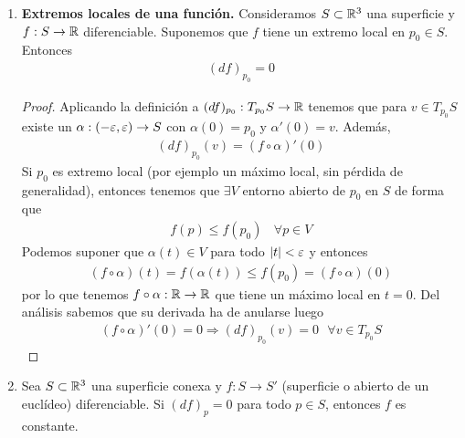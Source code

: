 \begin{propiedades}
\begin{enumerate}
        \item \textbf{Extremos locales de una función.} Consideramos $S\subset \mathbb{R}^3$ una superficie y $f:S\to \mathbb{R}$ diferenciable. Suponemos que $f$ tiene un extremo local en $p_0\in S$. Entonces 
        \begin{gather*}
            (df)_{p_0} = 0
        \end{gather*}
        \begin{proof}
            Aplicando la definición a $(df)_{p_0} : T_{p_0}S \to \mathbb{R}$ tenemos que para $v\in T_{p_0}S$ existe un $\alpha:(-\varepsilon, \varepsilon) \to S$ con $\alpha(0)=p_0$ y $\alpha'(0)=v$. Además,
            \begin{gather*}
                (df)_{p_0}(v) = (f\circ \alpha)'(0)
            \end{gather*}
            Si $p_0$ es extremo local (por ejemplo un máximo local, sin pérdida de generalidad), entonces tenemos que $\exists V$ entorno abierto de $p_0$ en $S$ de forma que 
            \begin{gather*}
                f(p) \leq f(p_0)\ \ \ \ \forall p \in V
            \end{gather*}
            Podemos suponer que $\alpha(t)\in V$ para todo $|t|<\varepsilon$ y entonces
            \begin{gather*}
                (f\circ \alpha)(t)= f(\alpha(t)) \leq f(p_0)=(f\circ \alpha)(0)
            \end{gather*}
            por lo que tenemos $f\circ \alpha : \mathbb{R}\to \mathbb{R}$ que tiene un máximo local en $t=0$. Del análisis sabemos que su derivada ha de anularse luego
            \begin{gather*}
                (f\circ \alpha)'(0)=0 \Rightarrow (df)_{p_0}(v)=0 \ \ \ \forall v \in T_{p_0}S
            \end{gather*}
        \end{proof}

        \item[2.bis.] Sea $S\subset \mathbb{R}^3$ una superficie conexa y $f:S\to S'$ (superficie o abierto de un euclídeo) diferenciable. Si $(df)_p=0$ para todo $p\in S$, entonces $f$ es constante.
        

\end{enumerate}
\end{propiedades}
